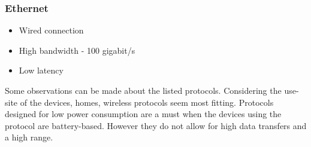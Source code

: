 \subsubsection{Ethernet \cite{wiki_ethernet}}

\begin{itemize}
\item Wired connection
\item High bandwidth - 100 gigabit/s
\item Low latency
\end{itemize}

Some observations can be made about the listed protocols. Considering the
use-site of the devices, homes, wireless protocols seem most fitting. Protocols
designed for low power consumption are a must when the devices using the
protocol are battery-based. However they do not allow for high data transfers
and a high range.